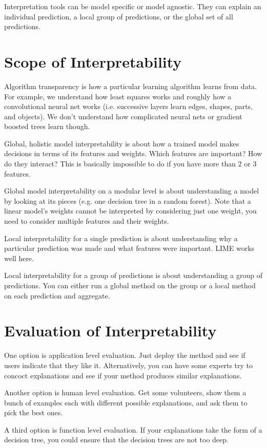 \documentclass[a4paper]{article}
\begin{document}
Interpretation tools can be model specific or model agnostic. They can
explain an individual prediction, a local group of predictions, or the global
set of all predictions.

\section{Scope of Interpretability}
Algorithm transparency is how a particular learning algorithm learns from data.
For example, we understand how least squares works and roughly how a
convolutional neural net works (i.e. successive layers learn edges, shapes,
parts, and objects). We don't understand how complicated neural nets or
gradient boosted trees learn though.

Global, holistic model interpretability is about how a trained model makes
decisions in terms of its features and weights. Which features are important?
How do they interact? This is basically impossible to do if you have more than
2 or 3 features.

Global model interpretability on a modular level is about understanding a
model by looking at its pieces (e.g. one decision tree in a random forest).
Note that a linear model's weights cannot be interpreted by considering just one
weight, you need to consider multiple features and their weights.

Local interpretability for a single prediction is about understanding why a
particular prediction was made and what features were important. LIME works
well here.

Local interpretability for a group of predictions is about understanding a group
of predictions. You can either run a global method on the group or a local
method on each prediction and aggregate.

\section{Evaluation of Interpretability}
One option is application level evaluation. Just deploy the method and see if
users indicate that they like it. Alternatively, you can have some experts try
to concoct explanations and see if your method produces similar explanations.

Another option is human level evaluation. Get some volunteers, show them
a bunch of examples each with different possible explanations, and ask them to
pick the best ones.

A third option is function level evaluation. If your explanations take the form
of a decision tree, you could ensure that the decision trees are not too deep.
\end{document}
